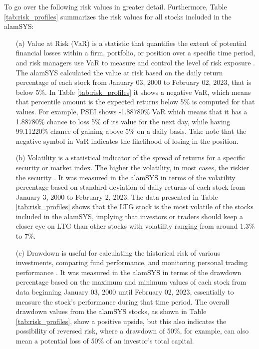 To go over the following risk values in greater detail. Furthermore, 
Table \ref{tab:risk_profiles} summarizes the risk values 
for all stocks included in the alamSYS:
\begin{itemize}
    \item[(a)] Value at Risk (VaR) is a statistic that quantifies 
    the extent of potential financial losses within a firm, 
    portfolio, or position over a specific time period, 
    and risk managers use VaR to measure and control the level 
    of risk exposure \cite{Kenton2023}.
    The alamSYS calculated the value at risk 
    based on the daily return percentage of each stock from January 
    03, 2000 to February 02, 2023, that is below 5\%. 
    In Table \ref{tab:risk_profiles} it shows a negative VaR, which means that percentile amount
    is the expected returns below 5\% is computed for that values.
    For example, PSEI shows -1.88780\% VaR which means that it
    has a 1.88780\% chance to loss 5\% of its value for the next day,
    while having 99.11220\% chance of gaining above 5\% on a 
    daily basis. Take note that the negative symbol in VaR indicates 
    the likelihood of losing in the position. 
    \item[(b)] Volatility is a statistical indicator of the spread 
    of returns for a specific security or market index. The higher 
    the volatility, in most cases, the riskier the security
    \cite{Hayes2023}.
    It was measured in the alamSYS in terms of the volatility 
    percentage based on standard deviation of daily returns of 
    each stock from January 3, 2000 to February 2, 2023.
    The data presented in Table \ref{tab:risk_profiles} shows that the 
    LTG stock is the most volatile of the stocks included in the 
    alamSYS, implying that investors or traders should keep a 
    closer eye on LTG than other stocks with volatility ranging 
    from around 1.3\% to 7\%.
    \item[(c)] Drawdown is useful for calculating the historical 
    risk of various investments, comparing fund performance, and 
    monitoring personal trading performance \cite{Mitchell2022}. 
    It was measured in the alamSYS in terms of the drawdown 
    percentage based on the maximum and minimum values of each 
    stock from data beginning January 03, 2000 until 
    February 02, 2023, essentially to measure the stock's 
    performance during that time period. The overall drawdown 
    values from the alamSYS stocks, as shown in 
    Table \ref{tab:risk_profiles}, show a 
    positive upside, but this also indicates the possibility of 
    reversed risk, where a drawdown of 50\%, for example, can 
    also mean a potential loss of 50\% of an investor's total capital.
\end{itemize}

